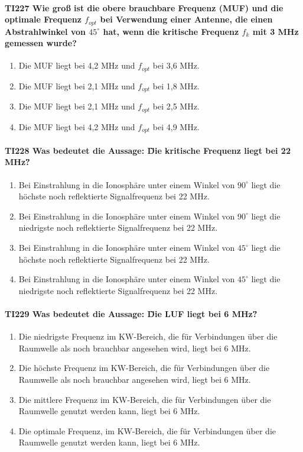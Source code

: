 \documentclass[8pt]{article}
\begin{document}
\paragraph*{TI227 Wie groß ist die obere brauchbare Frequenz (MUF) und die optimale Frequenz $f_{opt}$ bei Verwendung einer Antenne, die einen Abstrahlwinkel von $45^{\circ}$ hat, wenn die kritische Frequenz $f_{k}$ mit 3 MHz gemessen wurde?}
\begin{enumerate}[nolistsep,label=\Alph*]
\item Die MUF liegt bei 4,2 MHz und $f_{opt}$ bei 3,6 MHz.
\item Die MUF liegt bei 2,1 MHz und $f_{opt}$ bei 1,8 MHz.
\item Die MUF liegt bei 2,1 MHz und $f_{opt}$ bei 2,5 MHz.
\item Die MUF liegt bei 4,2 MHz und $f_{opt}$ bei 4,9 MHz.
\end{enumerate}

\paragraph*{TI228 Was bedeutet die Aussage: \"Die kritische Frequenz liegt bei 22 MHz\"?}
\begin{enumerate}[nolistsep,label=\Alph*]
\item Bei Einstrahlung in die Ionosphäre unter einem Winkel von $90^{\circ}$ liegt die höchste noch reflektierte Signalfrequenz bei 22 MHz.
\item Bei Einstrahlung in die Ionosphäre unter einem Winkel von $90^{\circ}$ liegt die niedrigste noch reflektierte Signalfrequenz bei 22 MHz.
\item Bei Einstrahlung in die Ionosphäre unter einem Winkel von $45^{\circ}$ liegt die höchste noch reflektierte Signalfrequenz bei 22 MHz.
\item Bei Einstrahlung in die Ionosphäre unter einem Winkel von $45^{\circ}$ liegt die niedrigste noch reflektierte Signalfrequenz bei 22 MHz.
\end{enumerate}

\paragraph*{TI229 Was bedeutet die Aussage: \"Die LUF liegt bei 6 MHz\"?}
\begin{enumerate}[nolistsep,label=\Alph*]
\item Die niedrigste Frequenz im KW-Bereich, die für Verbindungen über die Raumwelle als noch brauchbar angesehen wird, liegt bei 6 MHz. 
\item Die höchste Frequenz im KW-Bereich, die für Verbindungen über die Raumwelle als noch brauchbar angesehen wird, liegt bei 6 MHz. 
\item Die mittlere Frequenz im KW-Bereich, die für Verbindungen über die Raumwelle genutzt werden kann, liegt bei 6 MHz.
\item Die optimale Frequenz, im KW-Bereich, die für Verbindungen über die Raumwelle genutzt werden kann, liegt bei 6 MHz.
\end{enumerate}
\end{document}

